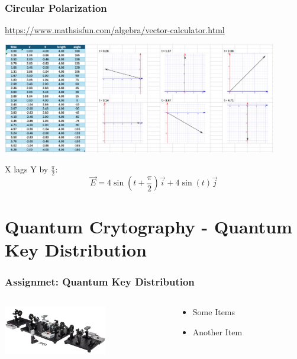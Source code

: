 \documentclass{beamer}
\begin{document}
\begin{frame}\frametitle{Circular Polarization}

\url{https://www.mathsisfun.com/algebra/vector-calculator.html}


\begin{center}
\includegraphics[width=12cm]{fig/pol2.jpg}
\end{center}

X lags Y by $\frac{\pi}{2}$:
\begin{equation}
\vec{E} = 4 \sin{(t + \frac{\pi}{2})} \vec{i} + 4 \sin{(t)} \vec{j}
\end{equation}

\end{frame}

\section{Quantum Crytography - Quantum Key Distribution}

\begin{frame}\frametitle{Assignmet: Quantum Key Distribution}
\begin{columns}
\begin{column}{4.5cm}
\begin{center}
\includegraphics[width=4.5cm]{fig/ThorQKD.jpg}
\end{center}
\end{column}
\begin{column}{7cm}
\begin{itemize}
\item Some Items
\item Another Item
\end{itemize}
\end{column}
\end{columns}
\end{frame}
\end{document}
